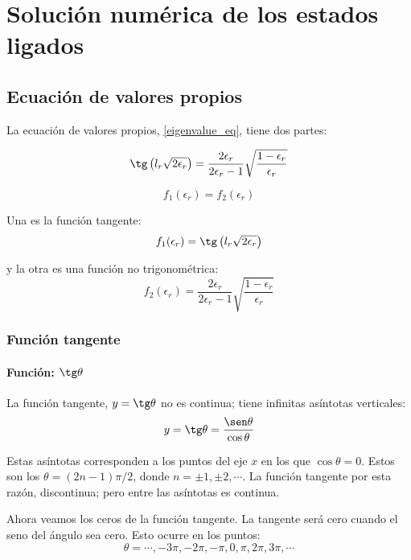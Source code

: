 
\chapter{Solución numérica de los estados ligados}

\section{Ecuación de valores propios}

La ecuación de valores propios, \ref{eigenvalue_eq}, tiene dos partes:

\[
\tg\left(l_r\sqrt{2\epsilon_r}\right)
=
\frac{2\epsilon_r}{2\epsilon_r-1}
\sqrt{\frac{1-\epsilon_r}{\epsilon_r}}
\]

\[
f_1(\epsilon_r)
=
f_2(\epsilon_r)
\]

Una es la función tangente:
\begin{equation}
\label{eigenval_func1}
f_1(\epsilon_r) = \tg\left({l_r\sqrt{2\epsilon_r}}\right)
\end{equation}

y la otra es una función no trigonométrica:
\begin{equation}
\label{eigenval_func2}
f_2(\epsilon_r) = \frac{2\epsilon_r}{2\epsilon_r-1}
\sqrt{\frac{1-\epsilon_r}{\epsilon_r}}
\end{equation}

\subsection{Función tangente}

\subsubsection{Función: $\tg\theta$}
La función tangente, $y = \tg\theta$ no es continua; tiene infinitas
asíntotas verticales:
\[
y = \tg\theta = \frac{\sen\theta}{\cos\theta}
\]

Estas asíntotas corresponden a los puntos del eje $x$ en los que $\cos\theta=0$.
Estos son los $\theta=(2n-1)\pi/2$, donde $n=\pm 1, \pm 2, \cdots$.
La función tangente por esta razón, discontinua; pero entre las asíntotas es
continua.

Ahora veamos los ceros de la función tangente. La tangente será cero cuando
el seno del ángulo sea cero. Esto ocurre en los puntos:
\begin{equation}
\label{asymptotes_tan}
\theta=\cdots,-3\pi,-2\pi,-\pi,0,\pi,2\pi,3\pi,\cdots
\end{equation}

